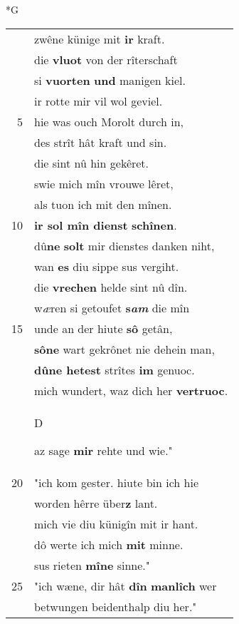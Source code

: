 \documentclass[8pt,a4paper,notitlepage]{article}
\begin{document}
\newpage
\begin{table}[ht]
\begin{minipage}[t]{0.5\linewidth}
\small
\begin{center}*G
\end{center}
\begin{tabular}{rl}
 & zwêne künige mit \textbf{ir} kraft.\\ 
 & die \textbf{vluot} von der rîterschaft\\ 
 & si \textbf{vuorten} \textbf{und} manigen kiel.\\ 
 & ir rotte mir vil wol geviel.\\ 
5 & hie was ouch Morolt durch in,\\ 
 & des strît hât kraft und sin.\\ 
 & die sint nû hin gekêret.\\ 
 & swie mich mîn vrouwe lêret,\\ 
 & als tuon ich mit den mînen.\\ 
10 & \textbf{ir sol mîn dienst} \textbf{schînen}.\\ 
 & dû\textbf{ne} \textbf{solt} mir dienstes danken niht,\\ 
 & wan \textbf{es} diu sippe sus vergiht.\\ 
 & die \textbf{vrechen} helde sint nû dîn.\\ 
 & w\textit{æ}ren si getoufet \textbf{s\textit{am}} die mîn\\ 
15 & unde an der hiute \textbf{sô} getân,\\ 
 & \textbf{sô}\textbf{ne} wart gekrônet nie dehein man,\\ 
 & \textbf{dûne hetest} strîtes \textbf{im} genuoc.\\ 
 & mich wundert, waz dich her \textbf{vertruoc}.\\ 
 & \begin{large}D\end{large}az sage \textbf{mir} rehte und wie."\\ 
20 & "ich kom gester. hiute bin ich hie\\ 
 & worden hêrre über\textbf{z} lant.\\ 
 & mich vie diu künigîn mit ir hant.\\ 
 & dô werte ich mich \textbf{mit} minne.\\ 
 & sus rieten \textbf{mîne} sinne."\\ 
25 & "ich wæne, dir hât \textbf{dîn} \textbf{manlîch} wer\\ 
 & betwungen beidenthalp diu her."\\ 

\end{tabular}
\end{minipage}
\end{table}
\end{document}
